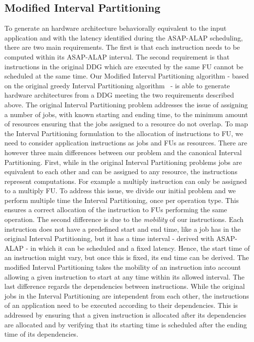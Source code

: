 \subsection{Modified Interval Partitioning}
\label{ssec:modified_interval_partitioning}
To generate an hardware architecture behaviorally equivalent to the input application and with the latency identified during the ASAP-ALAP scheduling, there are two main requirements. The first is that each instruction needs to be computed within its ASAP-ALAP interval. The second requirement is that instructions in the original DDG which are executed by the same FU cannot be scheduled at the same time.
Our Modified Interval Partitioning algorithm - based on the original greedy Interval Partitioning algorithm~\cite{greedyIntervalPartitioning} - is able to generate hardware architectures from a DDG meeting the two requirements described above. The original Interval Partitioning problem addresses the issue of assigning a number of jobs, with known starting and ending time, to the minimum amount of resources ensuring that the jobs assigned to a resource do not overlap. To map the Interval Partitioning formulation to the allocation of instructions to FU, we need to consider application instructions as jobs and FUs as resources. 
There are however three main differences between our problem and the canonical Interval Partitioning. First, while in the original Interval Partitioning problems jobs are equivalent to each other and can be assigned to any resource, the instructions represent computations. For example a multiply instruction can only be assigned to a multiply FU. To address this issue, we divide our initial problem and we perform multiple time the Interval Partitioning, once per operation type. This ensures a correct allocation of the instruction to FUs performing the same operation. The second difference is due to the \textit{mobility} of our instructions. Each instruction does not have a predefined start and end time, like a job has in the original Interval Partitioning, but it has a time interval - derived with ASAP-ALAP - in which it can be scheduled and a fixed latency. Hence, the start time of an instruction might vary, but once this is fixed, its end time can be derived. The modified Interval Partitioning takes the mobility of an instruction into account allowing a given instruction to start at any time within its allowed interval. The last difference regards the dependencies between instructions. While the original jobs in the Interval Partitioning are intependent from each other, the instructions of an application need to be executed according to their dependencies. This is addressed by ensuring that a given instruction is allocated after its dependencies are allocated and by verifying that its starting time is scheduled after the ending time of its dependencies.
